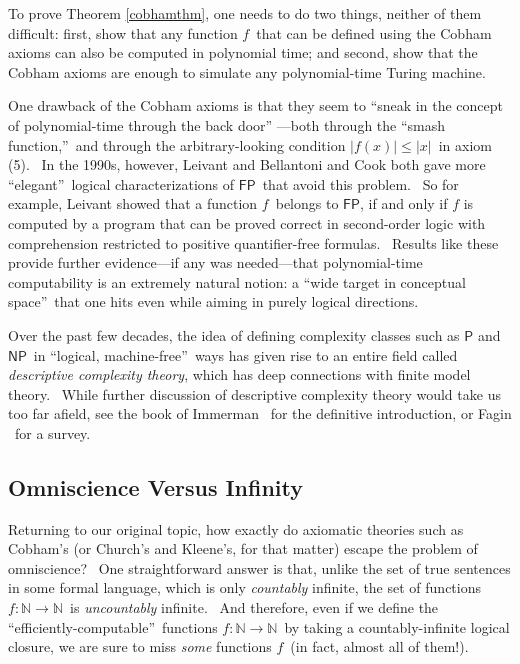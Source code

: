 \documentclass[12pt,onecolumn]{article}%
\begin{document}
To prove Theorem \ref{cobhamthm}, one needs to do two things, neither of them
difficult: first, show that any function $f$\ that can be defined using the
Cobham axioms can also be computed in polynomial time; and second, show that
the Cobham axioms are enough to simulate any polynomial-time Turing machine.

One drawback of the Cobham axioms is that they seem to \textquotedblleft sneak
in the concept of polynomial-time through the back door\textquotedblright%
---both through the \textquotedblleft smash function,\textquotedblright\ and
through the arbitrary-looking condition $\left\vert f\left(  x\right)
\right\vert \leq\left\vert x\right\vert $\ in axiom (5). \ In the 1990s,
however, Leivant \cite{leivant} and Bellantoni and Cook \cite{bellantonicook}
both gave more \textquotedblleft elegant\textquotedblright\ logical
characterizations of $\mathsf{FP}$\ that avoid this problem. \ So for example,
Leivant showed that a function $f$\ belongs to $\mathsf{FP}$, if and only if
$f$ is computed by a program that can be proved correct in second-order logic
with comprehension restricted to positive quantifier-free formulas. \ Results
like these provide further evidence---if any was needed---that polynomial-time
computability is an extremely natural notion: a \textquotedblleft wide target
in conceptual space\textquotedblright\ that one hits even while aiming in
purely logical directions.

Over the past few decades, the idea of defining complexity classes such as
$\mathsf{P}$ and $\mathsf{NP}$\ in \textquotedblleft logical,
machine-free\textquotedblright\ ways has given rise to an entire field called
\textit{descriptive complexity theory}, which has deep connections with finite
model theory. \ While further discussion of descriptive complexity theory
would take us too far afield, see the book of Immerman \cite{immerman}\ for
the definitive introduction, or Fagin \cite{fagin}\ for a survey.

\subsection{Omniscience Versus Infinity\label{OMNIINF}}

Returning to our original topic, how exactly do axiomatic theories such as
Cobham's (or Church's and Kleene's, for that matter) escape the problem of
omniscience? \ One straightforward answer is that, unlike the set of true
sentences in some formal language, which is only \textit{countably} infinite,
the set of functions $f:\mathbb{N}\rightarrow\mathbb{N}$\ is
\textit{uncountably} infinite. \ And therefore, even if we define the
\textquotedblleft efficiently-computable\textquotedblright\ functions
$f:\mathbb{N}\rightarrow\mathbb{N}$\ by taking a countably-infinite logical
closure, we are sure to miss \textit{some} functions $f$\ (in fact, almost all
of them!).
\end{document}
